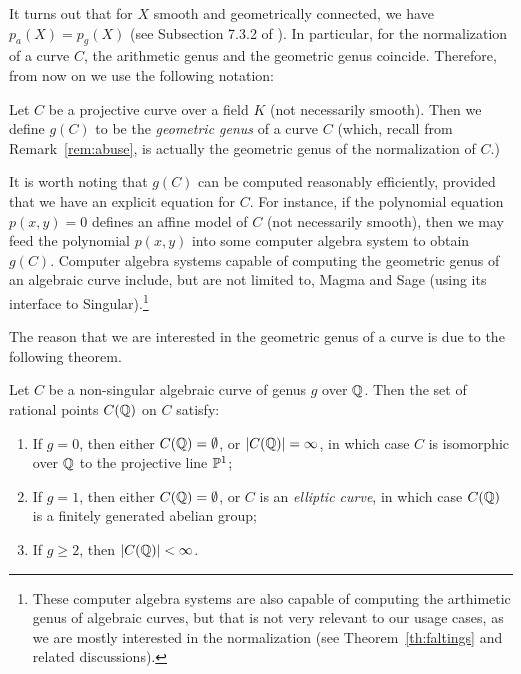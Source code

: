 It turns out that for $X$ smooth and geometrically connected, we have
$p_a(X) = p_g(X)$ (see Subsection 7.3.2 of \cite{MR1917232}). In
particular, for the normalization of a curve $C$, the arithmetic genus
and the geometric genus coincide. Therefore, from now on we use the
following notation:

\begin{definition}
  Let $C$ be a projective curve over a field $K$ (not necessarily
  smooth). Then we define $g(C)$ to be the \emph{geometric genus} of a
  curve $C$ (which, recall from Remark~\ref{rem:abuse}, is actually
  the geometric genus of the normalization of $C$.)
\end{definition}

\begin{remark}
  It is worth noting that $g(C)$ can be computed reasonably
  efficiently, provided that we have an explicit equation for $C$. For
  instance, if the polynomial equation $p(x, y) = 0$ defines an affine
  model of $C$ (not necessarily smooth), then we may feed the
  polynomial $p(x, y)$ into some computer algebra system to obtain
  $g(C)$. Computer algebra systems capable of computing the geometric
  genus of an algebraic curve include, but are not limited to, Magma
  and Sage (using its interface to Singular).\footnote{%
    These computer algebra systems are also capable of computing the
    arthimetic genus of algebraic curves, but that is not very
    relevant to our usage cases, as we are mostly interested in the
    normalization (see Theorem~\ref{th:faltings} and related
    discussions).}
\end{remark}

The reason that we are interested in the geometric genus of a curve is
due to the following theorem.

\begin{theorem}
  \label{th:faltings}
  Let $C$ be a non-singular algebraic curve of genus $g$ over
  $\Q$. Then the set of rational points $C(\Q)$ on $C$ satisfy:
  \begin{enumerate}
  \item If $g = 0$, then either $C(\Q) = \es$, or $|C(\Q)| = \infty$,
    in which case $C$ is isomorphic over $\Q$ to the projective line
    $\P^1$;

  \item If $g = 1$, then either $C(\Q) = \es$, or $C$ is an
    \emph{elliptic curve}, in which case $C(\Q)$ is a finitely
    generated abelian group;

  \item If $g \ge 2$, then $|C(\Q)| < \infty$.
  \end{enumerate}
\end{theorem}

